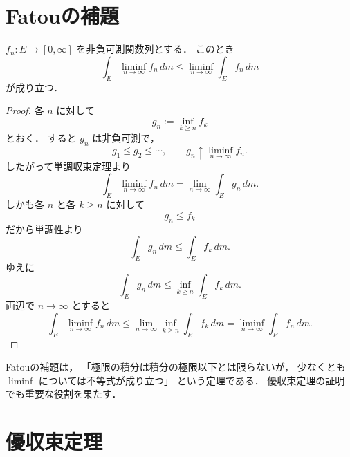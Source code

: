 \section{Fatouの補題}

\begin{theorem}[Fatouの補題]
$f_n:E \to [0,\infty]$ を非負可測関数列とする．
このとき
\[
\int_E \liminf_{n\to\infty} f_n\,dm
\le
\liminf_{n\to\infty}\int_E f_n\,dm
\]
が成り立つ．
\end{theorem}
\begin{proof}
各 $n$ に対して
\[
g_n:=\inf_{k\ge n}f_k
\]
とおく．
すると $g_n$ は非負可測で，
\[
g_1\le g_2\le \cdots,
\qquad
g_n \uparrow \liminf_{n\to\infty} f_n.
\]
したがって単調収束定理より
\[
\int_E \liminf_{n\to\infty} f_n\,dm
=
\lim_{n\to\infty}\int_E g_n\,dm.
\]
しかも各 $n$ と各 $k\ge n$ に対して
\[
g_n\le f_k
\]
だから単調性より
\[
\int_E g_n\,dm\le \int_E f_k\,dm.
\]
ゆえに
\[
\int_E g_n\,dm\le \inf_{k\ge n}\int_E f_k\,dm.
\]
両辺で $n\to\infty$ とすると
\[
\int_E \liminf_{n\to\infty} f_n\,dm
\le
\lim_{n\to\infty}\inf_{k\ge n}\int_E f_k\,dm
=
\liminf_{n\to\infty}\int_E f_n\,dm.
\]
\end{proof}

\begin{remark}
Fatouの補題は，
「極限の積分は積分の極限以下とは限らないが，
少なくとも \(\liminf\) については不等式が成り立つ」
という定理である．
優収束定理の証明でも重要な役割を果たす．
\end{remark}

\section{優収束定理}

